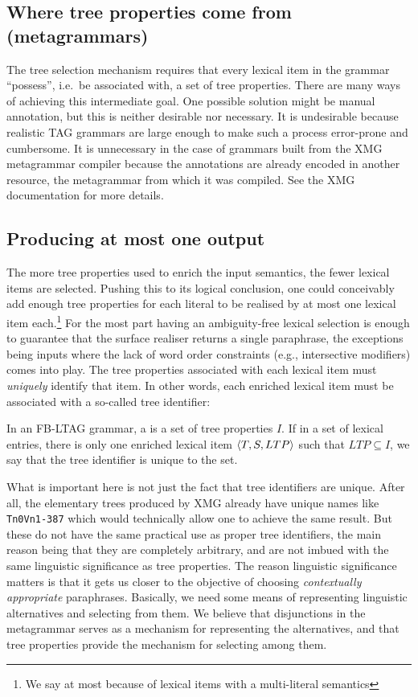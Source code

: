 \subsection{Where tree properties come from (metagrammars)}
\label{sec:tree-properties}

The tree selection mechanism requires that every lexical item in the
grammar ``possess'', i.e.\ be associated with, a set of tree properties.
There are many ways of achieving this intermediate goal.  One possible
solution might be manual annotation, but this is neither desirable nor
necessary.  It is undesirable because realistic TAG grammars are large
enough to make such a process error-prone and cumbersome.  It is
unnecessary in the case of grammars built from the
XMG metagrammar compiler because the annotations are already
encoded in another resource, the metagrammar from which it was compiled.
See the XMG documentation for more details.

\subsection{Producing at most one output}
\label{sec:producing-at-most-one-output}

The more tree properties used to enrich the input semantics, the fewer
lexical items are selected.  Pushing this to its logical conclusion,
one could conceivably add enough tree properties for each literal to be
realised by at most one lexical item each.\footnote{We say at most
because of lexical items with a multi-literal semantics}  For the most
part having an ambiguity-free lexical selection is enough to guarantee
that the surface realiser returns a single paraphrase, the exceptions
being inputs where the lack of word order constraints (e.g., intersective
modifiers) comes into play.  The tree properties associated with each
lexical item must \emph{uniquely} identify that item.  In other words,
each enriched lexical item must be associated with a so-called tree
identifier:

\begin{definition}
In an FB-LTAG grammar, a  is a set of tree
properties $I$.  If in a set of lexical entries, there is only
one enriched lexical item $\langle T,S,LTP \rangle$ such that $LTP
\subseteq I$, we say that the tree identifier is unique to the set.
\end{definition}

What is important here is not just the fact that tree identifiers are
unique.  After all, the elementary trees produced by XMG already have
unique names like \verb!Tn0Vn1-387! which would technically allow one to
achieve the same result.  But these do not have the same practical use
as proper tree identifiers, the main reason being that they are
completely arbitrary, and are not imbued with the same linguistic
significance as tree properties.  The reason linguistic significance
matters is that it gets us closer to the objective of choosing
\emph{contextually appropriate} paraphrases.  Basically, we need some
means of representing linguistic alternatives and selecting from them.
We believe that disjunctions in the metagrammar serves as a mechanism
for representing the alternatives, and that tree properties provide the
mechanism for selecting among them.
